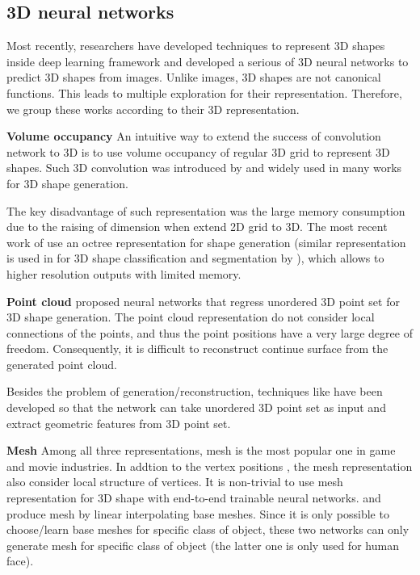 \subsection{3D neural networks}
Most recently, researchers have developed techniques to represent 3D shapes inside deep learning framework and developed a serious of 3D neural networks to predict 3D shapes from images. Unlike images, 3D shapes are not canonical functions. This leads to multiple exploration for their representation. Therefore, we group these works according to their 3D representation.

\noindent\textbf{Volume occupancy}
An intuitive way to extend the success of convolution network to 3D is to use volume occupancy of regular 3D grid to represent 3D shapes. Such 3D convolution was introduced by \cite{3dshapenet} and widely used in many works \cite{3DR2N2,learnobj} for 3D shape generation.

The key disadvantage of such representation was the large memory consumption due to the raising of dimension when extend 2D grid to 3D. The most recent work of \cite{octreegen} use
an octree representation for shape generation (similar representation is used in for 3D shape classification and segmentation by \cite{ocnn}), which allows to higher resolution outputs
with limited memory.

\noindent\textbf{Point cloud}
\cite{PSGN} proposed neural networks that regress unordered
3D point set for 3D shape generation. The point cloud representation
do not consider local connections of the points, and thus the point positions have
a very large degree of freedom. Consequently, it is difficult to reconstruct continue surface from the generated point cloud.

Besides the problem of generation/reconstruction, techniques like \cite{PointNet,NIPS2017_7095,pointcnn} have been developed so that the network can take unordered 3D point set as input and extract geometric features from 3D point set.

\noindent\textbf{Mesh}
Among all three representations, mesh is the most popular one in game and movie industries. In addtion to the vertex positions , the mesh representation also consider local structure of vertices. It is non-trivial to use mesh representation for 3D shape with end-to-end trainable neural networks. \cite{img2mesh} and \cite{endface} produce mesh by linear interpolating base meshes. Since it is only possible to choose/learn base meshes for specific class of object, these two networks can only generate mesh for specific class of object (the latter one is only used for human face).

